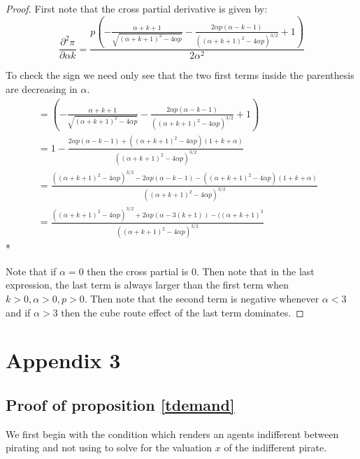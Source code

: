 \documentclass[11pt]{article}
\begin{document}
\begin{proof}
First note that the cross partial derivative is given by:
\begin{equation*}
\frac{\partial^2 \pi}{\partial \alpha k} =
\frac{p \left(-\frac{\alpha+k+1}{\sqrt{(\alpha+k+1)^2-4 \alpha p}}-\frac{2 \alpha p (\alpha-k-1)}{\left((\alpha+k+1)^2-4 \alpha p\right)^{3/2}}+1\right)}{2 \alpha^2} 
\end{equation*}

To check the sign we need only see that the two first terms inside the parenthesis are decreasing in $\alpha$. 
\begin{align*}
&= \left(-\frac{\alpha+k+1}{\sqrt{(\alpha+k+1)^2-4 \alpha p}}-\frac{2 \alpha p (\alpha-k-1)}{\left((\alpha+k+1)^2-4 \alpha p\right)^{3/2}}+1\right)&& \\
&= 1- \frac{2 \alpha p (\alpha-k-1)+((\alpha+k+1)^2-4 \alpha p)(1+k+\alpha)}{\left((\alpha+k+1)^2-4 \alpha p\right)^{3/2}}& \\
&= \frac{\left((\alpha+k+1)^2-4 \alpha p\right)^{3/2}-2 \alpha p (\alpha-k-1)-((\alpha+k+1)^2-4 \alpha p)(1+k+\alpha)}{\left((\alpha+k+1)^2-4 \alpha p\right)^{3/2}}& \\
&=\frac{\left((\alpha+k+1)^2-4 \alpha p\right)^{3/2}+2 \alpha p (\alpha-3(k+1))-((\alpha+k+1)^3}{\left((\alpha+k+1)^2-4 \alpha p\right)^{3/2}} &
\end{align*}*

Note that if $\alpha=0$ then the cross partial is 0. Then note that in the last expression, the last term is always larger than the first term when $k>0,\alpha>0, p>0$. Then note that the second term is negative whenever $\alpha<3$ and if $\alpha>3$ then the cube route effect of the last term dominates.  
\end{proof}

\section{Appendix 3}

\subsection{Proof of proposition \ref{tdemand}}

\label{tdemandp}

We first begin with the condition which renders an agents indifferent between pirating and not using to solve for the valuation $x$ of the indifferent pirate. 
\end{document}
